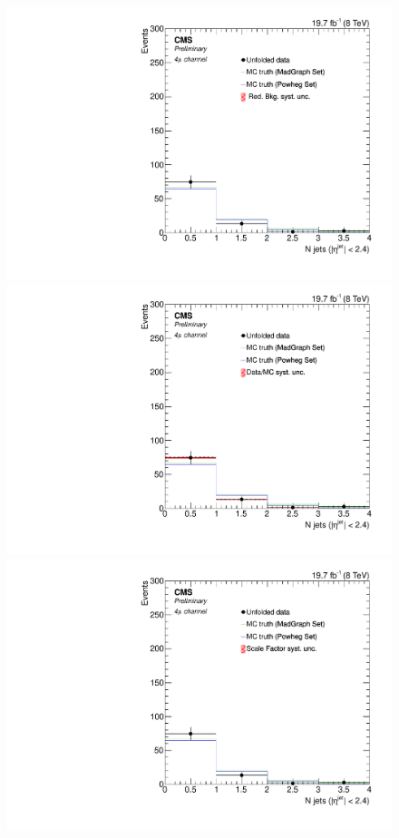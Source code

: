 \begin{figure}[hbtp]
\begin{center}
    \includegraphics[width=0.8\cmsFigWidth]{Figures/Unfolding/Systematics/ZZTo4m_CentralJets_RedBkg_Mad_fr}     
    \includegraphics[width=0.8\cmsFigWidth]{Figures/Unfolding/Systematics/ZZTo4m_CentralJets_UnfDataOverGenMC_Mad_fr}     
    \includegraphics[width=0.8\cmsFigWidth]{Figures/Unfolding/Systematics/ZZTo4m_CentralJets_SFSq_Mad_fr}        

\end{center}
\end{figure}
